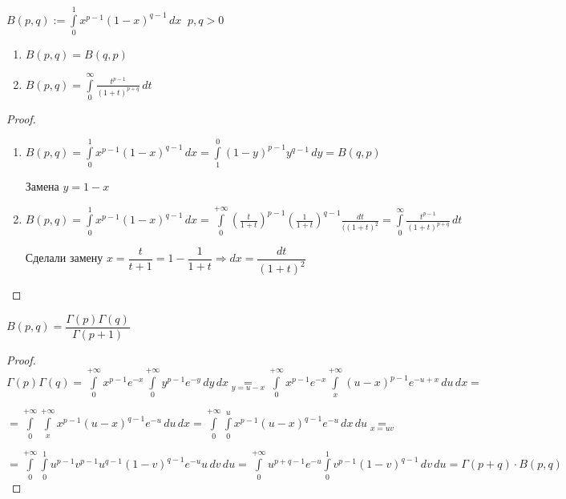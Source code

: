 
\begin{definition}[$B$-функции]\thmslashn
	
	$B(p, q) := \int\limits_{0}^{1} x^{p-1}(1-x)^{q-1}\,dx \;\; p, q > 0$
	
\end{definition}

\begin{properties}\thmslashn
	
	\begin{enumerate}
		\item 
		$B(p, q) = B(q, p)$
		\item 
		$B(p, q) = \int\limits_{0}^{\infty}\frac{t^{p-1}}{(1+t)^{p+q}}\,dt$
	\end{enumerate}
	
\end{properties}

\begin{proof}\thmslashn

	\begin{enumerate}
		\item 
		$B(p, q) = \int\limits_{0}^{1} x^{p-1}(1-x)^{q-1}\,dx = \int\limits_{1}^{0} (1-y)^{p-1}y^{q-1}\,dy = B(q, p)$
		
		Замена $y = 1-x$
		
		\item 
		$B(p, q) = \int\limits_{0}^{1} x^{p-1}(1-x)^{q-1}\,dx =\int\limits_{0}^{+\infty} \left(\frac{t}{1+t}\right)^{p-1}\left(\frac{1}{1+t}\right)^{q-1}\frac{dt}{((1+t)^2} = \int\limits_{0}^{\infty} \frac{t^{p-1}}{(1+t)^{p+q}}\,dt$
		
		Сделали замену $x = \dfrac{t}{t+1} = 1- \dfrac{1}{1+t} \Rightarrow dx = \dfrac{dt}{(1+t)^2}$
	\end{enumerate}

\end{proof}

\begin{theorem}
	$B(p, q) = \dfrac{\Gamma(p) \Gamma(q)}{\Gamma(p+1)}$
\end{theorem}


\begin{proof}\thmslashn
	
	$\Gamma(p)\Gamma(q) = \int\limits_{0}^{+\infty} x^{p-1} e^{-x} \int\limits_{0}^{+\infty} y^{p-1} e^{-y} \,dy\,dx \underset{y = u-x}= \int\limits_{0}^{+\infty} x^{p-1} e^{-x} \int\limits_{x}^{+\infty} (u-x)^{p-1} e^{-u+x} \,du\,dx = $
	
	
	$=\int\limits_{0}^{+\infty} \int\limits_{x}^{+\infty} x^{p-1}(u-x)^{q-1} e^{-u} \,du\,dx = \int\limits_{0}^{+\infty} \int\limits_{0}^{u} x^{p-1}(u-x)^{q-1} e^{-u} \,dx\,du \underset{x = uv}=$
	

	$=\int\limits_{0}^{+\infty} \int\limits_{0}^{1} u^{p-1}v^{p-1}u^{q-1} (1-v)^{q-1} e^{-u} u \,dv\,du = \int\limits_{0}^{+\infty} u^{p+q-1} e^{-u} \int\limits_{0}^{1} v^{p-1}(1-v)^{q-1} \,dv\,du = \Gamma(p+q)\cdot B(p, q)$
	
\end{proof}
